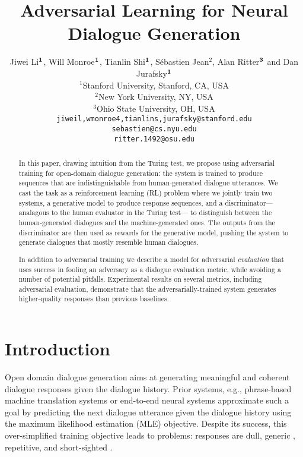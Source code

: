\documentclass[11pt]{article}
\title{Adversarial Learning for Neural Dialogue Generation}
\author{
Jiwei Li\hspace{1pt}$^{{{\bf 1}}}$, Will Monroe\hspace{1pt}$^{{{\bf 1}}}$, Tianlin Shi\hspace{1pt}$^{{{\bf 1}}}$,
S\'ebastien Jean$^2$,  Alan Ritter\hspace{1pt}$^{{{\bf 3}}}$ and Dan Jurafsky\hspace{1pt}$^{{{\bf 1}}}$ \\[0.4cm]
$^1$Stanford University, Stanford, CA, USA\\
$^2$New York University, NY, USA \\
$^3$Ohio State University, OH, USA \\
{\tt jiweil,wmonroe4,tianlins,jurafsky@stanford.edu} \\
{\tt sebastien@cs.nyu.edu}\\
{\tt  ritter.1492@osu.edu} 
}
\begin{document}
\maketitle


\begin{abstract}
In this paper, drawing intuition from the Turing test, we propose using adversarial training for open-domain dialogue generation: the system is trained to produce sequences
that are
 indistinguishable from human-generated dialogue utterances. We cast the task as a reinforcement learning (RL) problem where we jointly train two systems, a generative model to produce response sequences, and a discriminator---analagous to the human evaluator in the Turing test--- to distinguish between 
 the 
 human-generated dialogues and the machine-generated ones. The outputs from the discriminator are 
 then
 used as rewards for the generative model, pushing the system to generate dialogues that mostly resemble human dialogues.

In addition to adversarial training we describe a model
for adversarial {\em evaluation} that 
uses success in fooling an adversary as a dialogue evaluation metric,
while avoiding a number of potential pitfalls.
Experimental results on several
metrics, including adversarial evaluation, demonstrate
that the adversarially-trained system generates higher-quality responses
than previous baselines. 
\end{abstract}

\section{Introduction}
\label{sec:intro}
Open domain dialogue generation  \cite{ritter2011data,sordoni2015neural,xu2016incorporating,wen2016network,li2016persona,serban2016multiresolution,serban2016hierarchical} 
aims at generating meaningful and coherent dialogue responses given the dialogue history.
Prior systems, e.g., phrase-based machine translation systems \cite{ritter2011data,sordoni2015neural} or end-to-end neural systems \cite{shang2015neural,vinyals2015neural,li2015diversity,yao2015attention,luan2016lstm}
 approximate such a goal by 
predicting the next dialogue utterance  given the dialogue history using the maximum likelihood estimation (MLE) objective. 
Despite its success, this over-simplified training objective leads to problems:
responses are dull, generic 
 \cite{sordoni2015neural,serban2015hierarchical,li2015diversity}, 
 repetitive, and short-sighted \cite{li2016deep}. 
\end{document}
